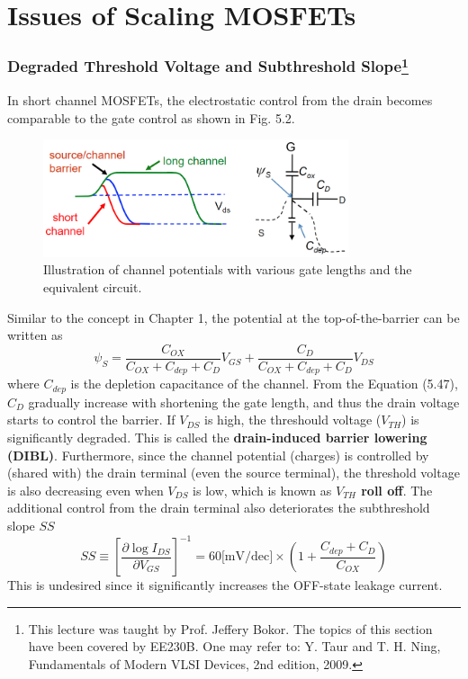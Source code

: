 \section{Issues of Scaling MOSFETs}
\subsubsection{Degraded Threshold Voltage and Subthreshold Slope\protect\footnote{This lecture was taught by Prof. Jeffery Bokor. The topics of this section have been covered by EE230B. One may refer to: Y. Taur and T. H. Ning, Fundamentals of Modern VLSI Devices, 2nd edition, 2009.}}
In short channel MOSFETs, the electrostatic control from the drain becomes comparable to the gate control as shown in Fig. 5.2.
\begin{figure}[tbp]
\includegraphics[width=0.8\textwidth]{figures/Fig5_2}
\centering
\caption{\small Illustration of channel potentials with various gate lengths and the equivalent circuit.}
\end{figure}
Similar to the concept in Chapter 1, the potential at the top-of-the-barrier can be written as \begin{equation}
    \psi_{S} = \frac{C_{OX}}{C_{OX}+C_{dep}+C_{D}}V_{GS} + \frac{C_{D}}{C_{OX}+C_{dep}+C_{D}}V_{DS}
\end{equation} where $C_{dep}$ is the depletion capacitance of the channel. From the Equation (5.47), $C_{D}$ gradually increase with shortening the gate length, and thus the drain voltage starts to control the barrier. If $V_{DS}$ is high, the threshould voltage ($V_{TH}$) is significantly degraded. This is called the {\bf drain-induced barrier lowering (DIBL)}. Furthermore, since the channel potential (charges) is controlled by (shared with) the drain terminal (even the source terminal), the threshold voltage is also decreasing even when $V_{DS}$ is low, which is known as {\bf $V_{TH}$ roll off}. The additional control from the drain terminal also deteriorates the subthreshold slope $SS$ \begin{equation}
    SS \equiv \left[\frac{\partial \log{I_{DS}}}{\partial V_{GS}}\right]^{-1} = 60\text{[mV/dec]}\times\left(1+\frac{C_{dep}+C_{D}}{C_{OX}}\right)
\end{equation} This is undesired since it significantly increases the OFF-state leakage current.
